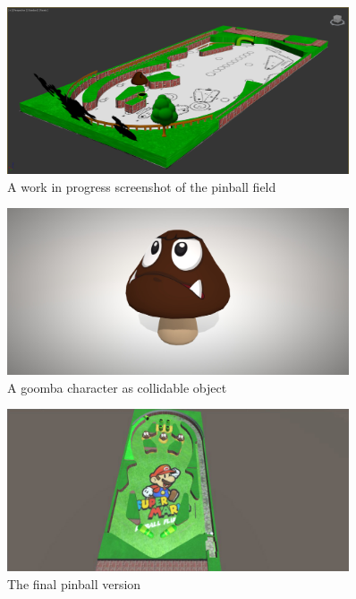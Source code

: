 \documentclass[11.5pt,oneside,a4paper]{scrartcl}
\newcounter{ct}
\begin{document}
\begin{figure}
	\centering
	\includegraphics[width=0.90\textwidth]{pinballinprogress.jpg}
	\caption{A work in progress screenshot of the pinball field}
	\label{fig:pinballinprogress}
	\vspace{0.1cm}
\end{figure}

\begin{figure}
	\centering
	\includegraphics[width=0.90\textwidth]{goomba.jpg}
	\caption{A goomba character as collidable object}
	\label{fig:goomba}
	\vspace{0.1cm}
\end{figure}

\begin{figure}
	\centering
	\includegraphics[width=0.90\textwidth]{final.jpg}
	\caption{The final pinball version}
	\label{fig:final}
	\vspace{0.1cm}
\end{figure}
\end{document}
